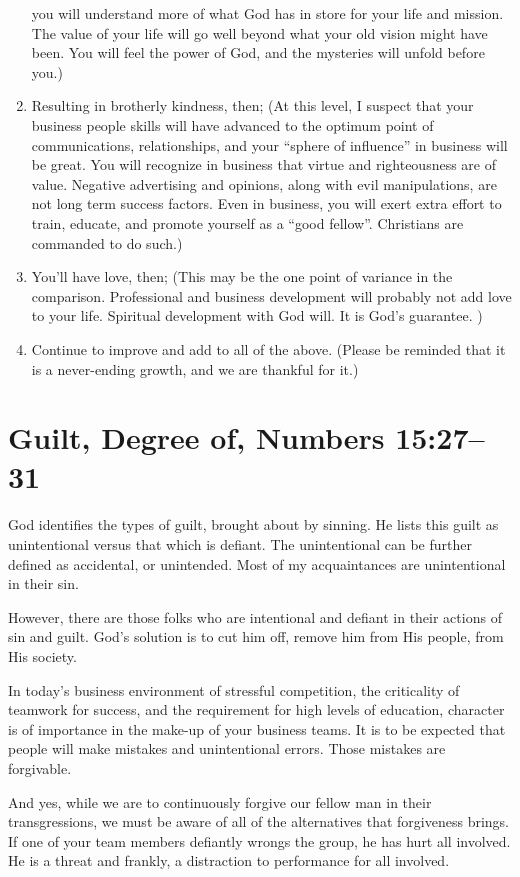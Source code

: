 \documentclass[12pt]{memoir}
\begin{document}
\begin{enumerate}
you will understand more of what God has in store for your life and
mission. The value of your life will go well beyond what your old
vision might have been. You will feel the power of God, and the mysteries
will unfold before you.) 
\item Resulting in brotherly kindness, then; (At this level, I suspect that
your business people skills will have advanced to the optimum point
of communications, relationships, and your ``sphere of influence''
in business will be great. You will recognize in business that virtue
and righteousness are of value. Negative advertising and opinions,
along with evil manipulations, are not long term success factors.
Even in business, you will exert extra effort to train, educate, and
promote yourself as a ``good fellow''. Christians are commanded
to do such.) 
\item You'll have love, then; (This may be the one point of variance in
the comparison. Professional and business development will probably
not add love to your life. Spiritual development with God will. It
is God's guarantee. ) 
\item Continue to improve and add to all of the above. (Please be reminded
that it is a never-ending growth, and we are thankful for it.) 
\end{enumerate}

\section[Guilt, Degree of]{Guilt, Degree of, Numbers 15:27--31}


God identifies the types of guilt, brought about by sinning. He lists this guilt as unintentional versus that which is defiant. The unintentional can be further defined as accidental, or unintended. Most of my acquaintances are unintentional in their sin.

However, there are those folks who are intentional and defiant in their actions of sin and guilt. God's solution is to cut him off, remove him from His people, from His society. 

In today's business environment of stressful competition, the criticality of teamwork for success, and the requirement for high levels of education, character is of importance in the make-up of your business teams. It is to be
expected that people will make mistakes and unintentional errors. Those mistakes are forgivable. 

And yes, while we are to continuously forgive our fellow man in their
transgressions, we must be aware of all of the alternatives that forgiveness
brings. If one of your team members defiantly wrongs the group, he has hurt all involved. He is a threat and frankly, a distraction
to performance for all involved.
\end{document}
